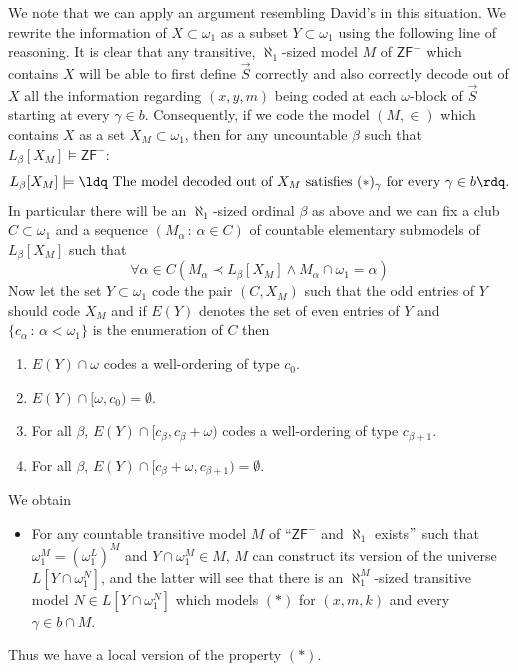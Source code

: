 \documentclass[a4paper,11pt]{article}
\newcommand{\ZFP}{\mathsf{ZF}^-}
\begin{document}
We note that we can apply an argument resembling David's in this situation. We rewrite the information of $X \subset \omega_1$ as a subset $Y \subset \omega_1$ using the following line of reasoning.
It is clear that any transitive, $\aleph_1$-sized model $M$ of $\ZFP$ which contains $X$ will be able to first define $\vec{S}$ correctly  and also correctly decode out of $X$ all the information regarding $(x,y,m)$ being coded at each $\omega$-block of $\vec{S}$ starting at every $\gamma \in b$. 
Consequently, if we code the model $(M,\in)$ which contains $X$ as a set $X_M \subset \omega_1$, then for any uncountable $\beta$ such that $L_{\beta}[X_M] \models \ZFP$:
\[L_{\beta}[X_M] \models \text{\ldq The model decoded out of }X_M \text{ satisfies $(\ast)_{\gamma}$ for every $\gamma \in b$\rdq.} \]
In particular there will be an $\aleph_1$-sized ordinal $\beta$ as above and we can fix a club $C \subset \omega_1$ and a sequence $(M_{\alpha} \, : \, \alpha \in C)$ of countable elementary submodels  of $L_{\beta} [X_M]$ such that
\[\forall \alpha \in C (M_{\alpha} \prec L_{\beta}[X_M] \land M_{\alpha} \cap \omega_1 = \alpha)\]
Now let the set $Y\subset \omega_1$ code the pair $(C, X_M)$ such that the odd entries of $Y$ should code $X_M$ and if $E(Y)$ denotes  the set of even entries of $Y$ and $\{c_{\alpha} \, : \, \alpha < \omega_1\}$ is the enumeration of $C$ then
\begin{enumerate}
\item $E(Y) \cap \omega$ codes a well-ordering of type $c_0$.
\item $E(Y) \cap [\omega, c_0) = \emptyset$.
\item For all $\beta$, $E(Y) \cap [c_{\beta}, c_{\beta} + \omega)$ codes a well-ordering of type $c_{\beta+1}$.
\item For all $\beta$, $E(Y) \cap [c_{\beta}+\omega, c_{\beta+1})= \emptyset$.
\end{enumerate}
We obtain
\begin{itemize}
\item[$({\ast}{\ast})$] For any countable transitive model $M$ of  ``$\ZFP$ and $\aleph_1$ exists$"$ such that $\omega_1^M=(\omega_1^L)^M$ and $ Y \cap \omega_1^M \in M$, $M$ can construct its version of the universe $L[Y \cap \omega_1^N]$, and the latter will see that there is an $\aleph_1^M$-sized transitive model $N \in L[Y \cap \omega_1^N]$ which models $(\ast)$ for $(x,m,k)$ and every $\gamma \in b \cap M$.
\end{itemize}
Thus we have a local version of the property $(\ast)$.
\end{document}
